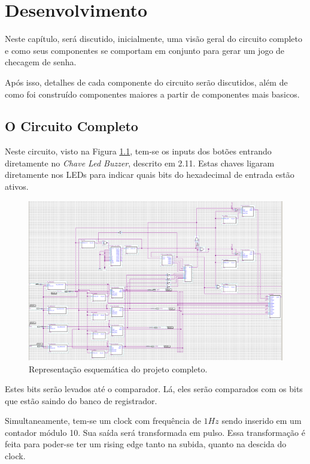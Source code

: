 \chapter{Desenvolvimento}\label{cap_2_Fundamentaçao}

Neste capítulo, será discutido, inicialmente, uma visão geral do circuito completo e como seus componentes se comportam em conjunto para gerar um jogo de checagem de senha.

Após isso, detalhes de cada componente do circuito serão discutidos, além de como foi construído componentes maiores a partir de componentes mais basicos.

\section{O Circuito Completo}

Neste circuito, visto na Figura \ref{fig:2.1}, tem-se os inputs dos botões entrando diretamente no \emph{Chave Led Buzzer}, descrito em 2.11. Estas chaves ligaram diretamente nos LEDs para indicar quais bits do hexadecimal de entrada estão ativos.

\begin{figure}[H]
	\centering
	\includegraphics[width=1\columnwidth]{FIGURAS/cap_2/projeto.png}
	\caption{Representação esquemática do projeto completo.}
        \label{fig:2.1}
\end{figure}


Estes bits serão levados até o comparador. Lá, eles serão comparados com os bits que estão saindo do banco de registrador.

Simultaneamente, tem-se um clock com frequência de $1Hz$ sendo inserido em um contador módulo 10. Sua saída será transformada em pulso. Essa transformação é feita para poder-se ter um rising edge tanto na subida, quanto na descida do clock.

